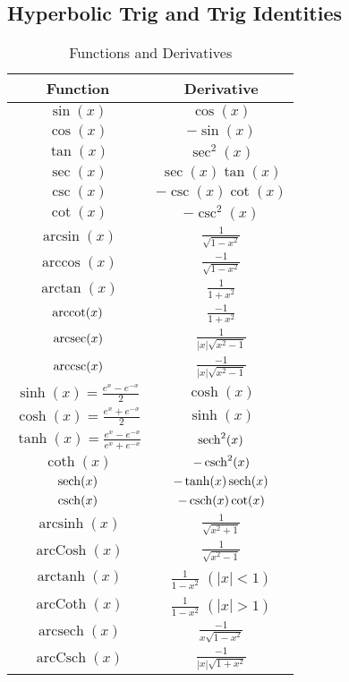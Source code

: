 \documentclass[12pt]{article}
\theoremstyle{definition}
\theoremstyle{remark}
\numberwithin{equation}{section}
\DeclareMathOperator{\arcosh}{arcCosh}
\DeclareMathOperator{\arsinh}{arcsinh}
\DeclareMathOperator{\artanh}{arctanh}
\DeclareMathOperator{\arsech}{arcsech}
\DeclareMathOperator{\arcsch}{arcCsch}
\DeclareMathOperator{\arcoth}{arcCoth}
\begin{document}
\vspace{15pt}



\subsection{Hyperbolic Trig and Trig Identities}

\vspace{15pt}

\bgroup
\def\arraystretch{1.5}
\begin{table}[H]
        \centering
        \caption{Functions and Derivatives}
        \begin{tabular}{c|c}
                Function & Derivative \\ \hline
                $\sin(x)$ & $\cos(x)$ \\
                $\cos(x)$ & $-\sin(x)$ \\
                $\tan(x)$ & $\sec^2(x)$ \\
                $\sec(x)$ & $\sec(x)\tan(x)$ \\
                $\csc(x)$ & $-\csc(x)\cot(x)$ \\
                $\cot(x)$ & $-\csc^2(x)$ \\
                $\arcsin(x)$ & $\frac{1}{\sqrt{1-x^2}}$ \\
                $\arccos(x)$ & $\frac{-1}{\sqrt{1-x^2}}$ \\
                $\arctan(x)$ & $\frac{1}{1+x^2}$ \\
                $\arccot(x)$ & $\frac{-1}{1+x^2}$ \\
                $\arcsec(x)$ & $\frac{1}{|x|\sqrt{x^2-1}}$ \\
                $\arccsc(x)$ & $\frac{-1}{|x|\sqrt{x^2-1}}$ \\
                $\sinh(x) = \frac{e^x-e^{-x}}{2}$ & $\cosh(x)$ \\
                $\cosh(x) = \frac{e^x+e^{-x}}{2}$ & $\sinh(x)$ \\
                $\tanh(x) = \frac{e^x-e^{-x}}{e^x+e^{-x}}$ & $\sech^2(x)$ \\
                $\coth(x)$ & $-\csch^2(x)$ \\
                $\sech(x)$ & $-\tanh(x)\sech(x)$ \\
                $\csch(x)$ & $-\csch(x)\cot(x)$ \\
                $\arsinh(x)$ & $\frac{1}{\sqrt{x^2+1}}$ \\
                $\arcosh(x)$ & $\frac{1}{\sqrt{x^2-1}}$ \\
                $\artanh(x)$ & $\frac{1}{1-x^2}$ $(|x| < 1)$ \\
                $\arcoth(x)$ & $\frac{1}{1-x^2}$ $(|x| > 1)$ \\
                $\arsech(x)$ & $\frac{-1}{x\sqrt{1-x^2}}$ \\
                $\arcsch(x)$ & $\frac{-1}{|x|\sqrt{1+x^2}}$ \\
        \end{tabular}
\end{table}
\egroup
\end{document}
